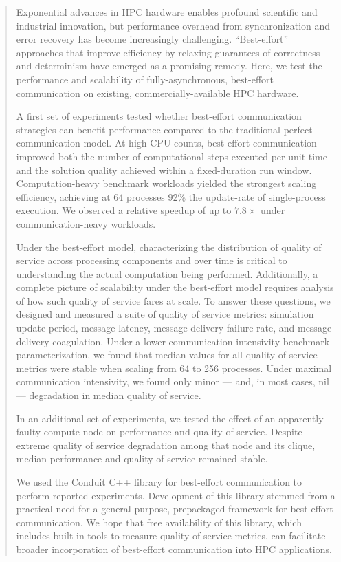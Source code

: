 \begin{abstract}
Exponential advances in HPC hardware enables profound scientific and industrial innovation, but performance overhead from synchronization and error recovery has become increasingly challenging.
``Best-effort'' approaches that improve efficiency by relaxing guarantees of correctness and determinism have emerged as a promising remedy.
Here, we test the performance and scalability of fully-asynchronous, best-effort communication on existing, commercially-available HPC hardware.

A first set of experiments tested whether best-effort communication strategies can benefit performance compared to the traditional perfect communication model.
At high CPU counts, best-effort communication improved both the number of computational steps executed per unit time and the solution quality achieved within a fixed-duration run window.
Computation-heavy benchmark workloads yielded the strongest scaling efficiency, achieving at 64 processes 92\% the update-rate of single-process execution.
We observed a relative speedup of up to $7.8\times$ under communication-heavy workloads.

Under the best-effort model, characterizing the distribution of quality of service across processing components and over time is critical to understanding the actual computation being performed.
Additionally, a complete picture of scalability under the best-effort model requires analysis of how such quality of service fares at scale.
To answer these questions, we designed and measured a suite of quality of service metrics: simulation update period, message latency, message delivery failure rate, and message delivery coagulation.
Under a lower communication-intensivity benchmark parameterization, we found that median values for all quality of service metrics were stable when scaling from 64 to 256 processes.
Under maximal communication intensivity, we found only minor --- and, in most cases, nil --- degradation in median quality of service.

In an additional set of experiments, we tested the effect of an apparently faulty compute node on performance and quality of service.
Despite extreme quality of service degradation among that node and its clique, median performance and quality of service remained stable.

We used the Conduit C++ library for best-effort communication to perform reported experiments.
Development of this library stemmed from a practical need for a general-purpose, prepackaged framework for best-effort communication.
We hope that free availability of this library, which includes built-in tools to measure quality of service metrics, can facilitate broader incorporation of best-effort communication into HPC applications.
\end{abstract}

